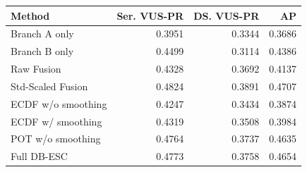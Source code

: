 \begin{tabular}{lrrr}
\toprule
Method & Ser. VUS-PR & DS. VUS-PR & AP \\
\midrule
Branch A only & 0.3951 & 0.3344 & 0.3686 \\
Branch B only & 0.4499 & 0.3114 & 0.4386 \\
Raw Fusion & 0.4328 & 0.3692 & 0.4137 \\
Std-Scaled Fusion & 0.4824 & 0.3891 & 0.4707 \\
ECDF w/o smoothing & 0.4247 & 0.3434 & 0.3874 \\
ECDF w/ smoothing & 0.4319 & 0.3508 & 0.3984 \\
POT w/o smoothing & 0.4764 & 0.3737 & 0.4635 \\
Full DB-ESC & 0.4773 & 0.3758 & 0.4654 \\
\bottomrule
\end{tabular}
